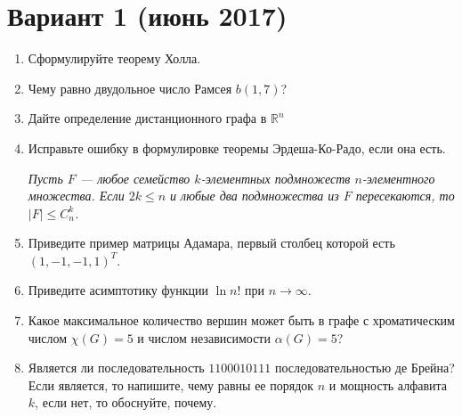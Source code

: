 \documentclass[oneside]{book}
\begin{document}
\section{Вариант 1 (июнь 2017)}
\begin{enumerate}
\item Сформулируйте теорему Холла.
\item Чему равно двудольное число Рамсея $b(1,7)$?
\item Дайте определение дистанционного графа в $\mathbb{R}^n$
\item Исправьте ошибку в формулировке теоремы Эрдеша-Ко-Радо, если она есть.

\textit{Пусть $F$ --- любое семейство $k$-элементных подмножеств $n$-элементного множества. Если $2k \leqslant n$ и любые два подмножества из $F$ пересекаются, то $|F| \leqslant C_n^k$.}
\item Приведите пример матрицы Адамара, первый столбец которой есть $(1, -1, -1, 1)^T$.
\item Приведите асимптотику функции $\ln n!$ при $n \rightarrow \infty$.
\item Какое максимальное количество вершин может быть в графе с хроматическим числом $\chi(G) = 5$ и числом независимости $\alpha(G) = 5$?
\item Является ли последовательность $1100010111$ последовательностью де Брейна? Если является, то напишите, чему равны ее порядок $n$ и мощность алфавита $k$, если нет, то обоснуйте, почему.
\end{enumerate}
\end{document}
